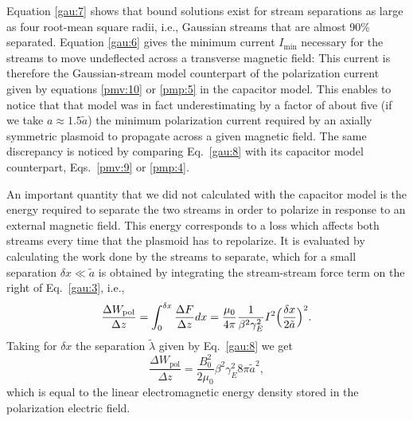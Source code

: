 \documentclass [12pt,a4paper,     ]{report} %
\begin{document}
  Equation \eqref{gau:7} shows that bound solutions exist for stream separations as large as four root-mean square radii, i.e., Gaussian streams that are almost 90\% separated.  Equation \eqref{gau:6} gives the minimum current $I_{\text{min}}$ necessary for the streams to move undeflected across a transverse magnetic field: This current is therefore the Gaussian-stream model counterpart of the polarization current given by equations \eqref{pmv:10} or \eqref{pmp:5} in the capacitor model.  This enables to notice that that model was in fact underestimating by a factor of about five (if we take $a\approx 1.5\tilde{a}$) the minimum polarization current required by an axially symmetric plasmoid to propagate across a given magnetic field.   The same discrepancy is noticed by comparing Eq.~\eqref{gau:8} with its capacitor model counterpart, Eqs.~\eqref{pmv:9} or \eqref{pmp:4}.

    An important quantity that we did not calculated with the capacitor model is the energy required to separate the two streams in order to polarize in response to an external magnetic field.  This energy corresponds to a loss which affects both streams every time that the plasmoid has to repolarize.   It is evaluated by calculating the work done by the streams to separate, which for a small separation $\delta x \ll \tilde{a}$ is obtained by integrating the stream-stream force term on the right of Eq.~\eqref{gau:3}, i.e.,
%
\begin{equation}\label{gau:9} %
                   \frac{\Delta W_{\text{pol}}}{\Delta z} =
 \int_0^{\delta x} \frac{\Delta F}{\Delta z} dx = 
                   \frac{\mu_0}{4\pi} \frac{1}{\beta^2\gamma^2_E} I^2
                   \Bigl(\frac{\delta x}{2\tilde{a}}\Bigr)^2.
\end{equation}
%
Taking for $\delta x$ the separation $\tilde{\lambda}$ given by Eq.~\eqref{gau:8} we get
%
\begin{equation}\label{gau:10} %
                  \frac{\Delta W_{\text{pol}}}{\Delta z} =
                  \frac{B_0^2}{2\mu_0} \beta^2\gamma^2_E
                  8 \pi \tilde{a}^2,
\end{equation}
%
which is equal to the linear electromagnetic energy density stored in the polarization electric field.
\end{document}
